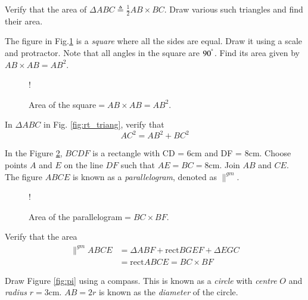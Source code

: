 \documentclass[journal,12pt,twocolumn]{IEEEtran}
\begin{document}
\begin{problem}
Verify that the area of $\Delta ABC \triangleq \frac{1}{2}AB\times BC$. Draw various such triangles and find their area.
\end{problem}
%
\begin{problem}
The figure  in Fig.\ref{fig:square} is a {\em square} where all the sides are equal. Draw it using a scale and protractor.  Note that all angles in the square are $90^{\degree}$.  Find its area given by $AB \times AB = AB^2$.
\end{problem}
%
%
\begin{figure}[!h]
\centering
\resizebox {\columnwidth} {!} {

}
\caption{Area of the square$= AB \times AB = AB^2$.}
\label{fig:square}
\end{figure}
%
\begin{problem}
In $\Delta ABC$ in Fig. \ref{fig:rt_triang}, verify that 
\begin{equation}
\label{eq:baudhayana}
AC^2 = AB^2 + BC^2
\end{equation}
\end{problem}
\begin{problem}
In the Figure \ref{fig:quad_area}, $BCDF$ is a rectangle with CD = 6cm and DF = 8cm.  Choose points $A$ and $E$ on the line $DF$ such that $AE = BC = 8$cm.  Join $AB$ and $CE$.  The figure $ABCE$ is known as a {\em parallelogram}, denoted as $\parallel^{gm}$. 
\end{problem}
\begin{figure}[!h]
\centering
\resizebox {\columnwidth} {!} {

}
\caption{Area of the parallelogram$= BC \times BF$.}
\label{fig:quad_area}
\end{figure}
%
\begin{problem}
Verify that the area
\begin{align}
 \parallel^{gm} ABCE & = \Delta ABF +  \text{rect}BGEF  + \Delta EGC
\\
&= \text{rect}ABCE  = BC \times BF
\end{align}
\end{problem}
%
%
\begin{problem}
Draw Figure \ref{fig:pi} using a compass.  This is known as a {\em circle} with {\em centre} $O$ and {\em radius} $r = 3$cm.  $AB = 2r$ is known as the {\em diameter} of the circle.
\end{problem}
\end{document}
